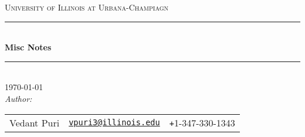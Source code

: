 %
\newcommand{\HRule}{\rule{\linewidth}{0.5mm}}
\center
\textsc{\LARGE University of Illinois at Urbana-Champiagn}\\[1cm]
\HRule \\[0.4cm]

{ 
  \huge \bfseries Misc Notes \\[0.5cm]
}

\HRule \\[1cm]
{\Large \today}\\[1cm]
\emph{Author:}\\
\begin{tabular}{l r l}
  Vedant Puri         & \href{mailto:vpuri3@illinois.edu}{\texttt{vpuri3@illinois.edu}}  &  \texttt{+}1-347-330-1343 \\
\end{tabular}\\[0.5cm]

\vfill